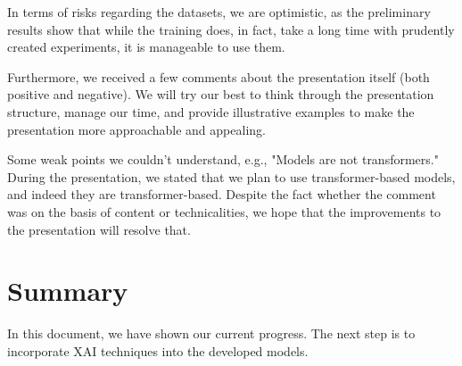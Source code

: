 \documentclass[11pt]{article}
\begin{document}
In terms of risks regarding the datasets, we are optimistic, as the preliminary results show that while the training does, in fact, take a long time with prudently created experiments, it is manageable to use them.

Furthermore, we received a few comments about the presentation itself (both positive and negative). We will try our best to think through the presentation structure, manage our time, and provide illustrative examples to make the presentation more approachable and appealing.

Some weak points we couldn't understand, e.g., "Models are not transformers." During the presentation, we stated that we plan to use transformer-based models, and indeed they are transformer-based. Despite the fact whether the comment was on the basis of content or technicalities, we hope that the improvements to the presentation will resolve that.




\section{Summary}
In this document, we have shown our current progress. The next step is to incorporate XAI techniques into the developed models.




\end{document}
